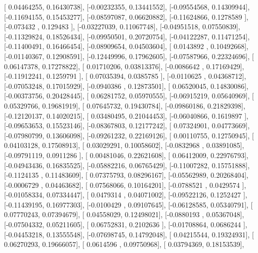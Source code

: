 \documentclass{article}
\begin{document}
       [ 0.04464255,  0.16430738],
       [-0.00232355,  0.13441552],
       [-0.09554568,  0.14309944],
       [-0.11694155,  0.15453277],
       [-0.08597087,  0.06620882],
       [-0.11624866,  0.1278589 ],
       [-0.073432  ,  0.129483  ],
       [-0.03227039,  0.11067748],
       [-0.04951518,  0.07550839],
       [-0.11329824,  0.18526434],
       [-0.09950501,  0.20720754],
       [-0.04122287,  0.11471254],
       [-0.11400491,  0.16466454],
       [-0.08909654,  0.04503604],
       [ 0.0143892 ,  0.10492668],
       [-0.01140367,  0.12908591],
       [-0.12449996,  0.17962605],
       [-0.07587966,  0.22324696],
       [ 0.06147378,  0.17278822],
       [ 0.01710206,  0.03813376],
       [-0.0086642 ,  0.17169429],
       [-0.11912241,  0.1259791 ],
       [ 0.07035394,  0.0385785 ],
       [-0.0110625 ,  0.04368712],
       [-0.07053248,  0.17015929],
       [-0.0940386 ,  0.12873501],
       [ 0.06520045,  0.14830086],
       [-0.00373756,  0.20428445],
       [ 0.06281752,  0.05970555],
       [-0.06915219,  0.05640969],
       [ 0.05329766,  0.19681919],
       [ 0.07645732,  0.19430784],
       [-0.09860186,  0.21829398],
       [-0.12120137,  0.14020215],
       [ 0.03480495,  0.21044453],
       [-0.06040866,  0.1619897 ],
       [-0.09653653,  0.15523146],
       [-0.08367803,  0.12177242],
       [ 0.07324901,  0.04773669],
       [-0.07980799,  0.13606098],
       [-0.09261232,  0.22169126],
       [ 0.00110755,  0.12750945],
       [ 0.04103128,  0.17508913],
       [ 0.03029291,  0.10058602],
       [-0.0832968 ,  0.03891085],
       [-0.09791119,  0.0911286 ],
       [ 0.00481046,  0.22621608],
       [ 0.06412009,  0.22976793],
       [-0.04943436,  0.16835525],
       [-0.05882216,  0.06765429],
       [-0.11007282,  0.15751888],
       [-0.1124135 ,  0.11483609],
       [ 0.07375793,  0.08296167],
       [-0.05562989,  0.20268404],
       [-0.0006729 ,  0.04463682],
       [ 0.07568066,  0.10164201],
       [-0.0788521 ,  0.0429574 ],
       [-0.01058334,  0.07334447],
       [ 0.0479314 ,  0.04071002],
       [-0.09522126,  0.1252427 ],
       [-0.11439195,  0.16977303],
       [-0.0100429 ,  0.09107645],
       [-0.06128585,  0.05340791],
       [ 0.07770243,  0.07394679],
       [ 0.04558029,  0.12498021],
       [-0.0880193 ,  0.05367048],
       [-0.07504332,  0.05211605],
       [ 0.06752831,  0.2102636 ],
       [-0.01708864,  0.0686244 ],
       [-0.04453218,  0.13555548],
       [-0.07698745,  0.14792048],
       [ 0.04215544,  0.19324931],
       [ 0.06270293,  0.19666057],
       [ 0.0614596 ,  0.09750968],
       [ 0.03794369,  0.18153539],
\end{document}
